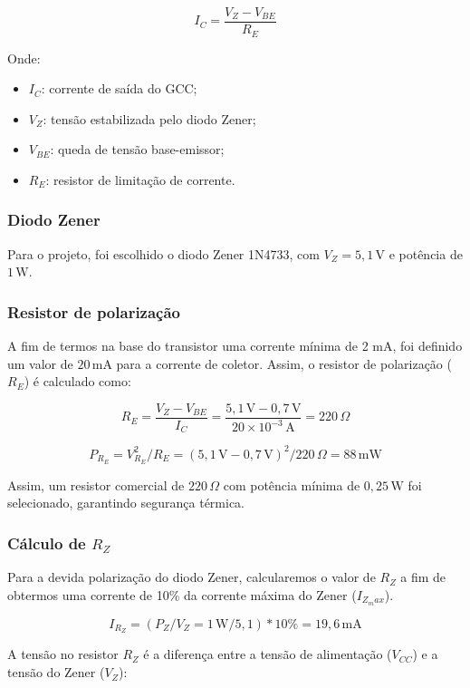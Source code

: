 \[
I_C = \frac{V_Z - V_{BE}}{R_E}
\]

Onde:  
\begin{itemize}
    \item \(I_C\): corrente de saída do GCC;
    \item \(V_Z\): tensão estabilizada pelo diodo Zener;
    \item \(V_{BE}\): queda de tensão base-emissor;
    \item \(R_E\): resistor de limitação de corrente.
\end{itemize}  

\subsubsection*{Diodo Zener}

Para o projeto, foi escolhido o diodo Zener 1N4733, com \(V_Z = 5,1 \, \text{V}\) e potência de \(1 \, \text{W}\).

\subsubsection*{Resistor de polarização}

A fim de termos na base do transistor uma corrente mínima de 2 mA, foi definido um valor de \(20 \, \text{mA}\) para a corrente de coletor. Assim, o resistor de polarização (\(R_E\)) é calculado como:

\[
R_E = \frac{V_Z - V_{BE}}{I_C} = \frac{5,1 \, \text{V} - 0,7 \, \text{V}}{20 \times 10^{-3} \, \text{A}} = 220 \, \Omega
\]

\[
P_{R_E} = V_{R_E}^2 / R_E = (5,1 \, \text{V} - 0,7 \, \text{V})^2 / 220 \, \Omega = 88 \, \text{mW}
\]

Assim, um resistor comercial de \(220 \, \Omega\) com potência mínima de \(0,25 \, \text{W}\) foi selecionado, garantindo segurança térmica.  

\subsubsection*{Cálculo de \(R_Z\)}  

Para a devida polarização do diodo Zener, calcularemos o valor de \(R_Z\) a fim de obtermos uma corrente de 10\% da corrente máxima do Zener (\(I_{Z_max}\)).

\[
I_{R_Z} = (P_Z / V_Z = 1 \, \text{W} / 5,1) * 10\% = 19,6 \, \text{mA}
\]

A tensão no resistor \(R_Z\) é a diferença entre a tensão de alimentação (\(V_{CC}\)) e a tensão do Zener (\(V_Z\)):  

